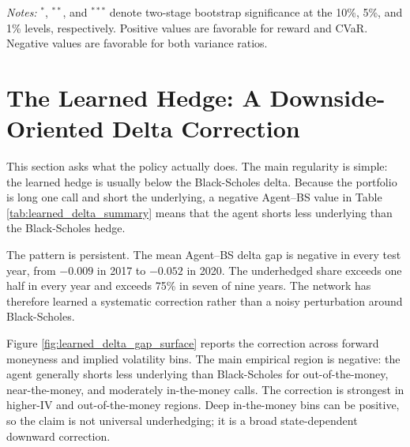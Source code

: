 \documentclass[a4paper,12pt]{article}
\numberwithin{equation}{section}
\begin{document}
\begin{table}[H]
    \centering
    \caption{Compact walk-forward performance summary. Entries are agent-minus-Black-Scholes differences for reward and CVaR, and log agent-to-Black-Scholes ratios for downside variance and ordinary variance.}
    \label{tab:wf_metric_summary}
    
    \vspace{0.15cm}

    \begin{minipage}{0.92\textwidth}
    \footnotesize
    \emph{Notes:} $^{*}$, $^{**}$, and $^{***}$ denote two-stage bootstrap significance at the 10\%, 5\%, and 1\% levels, respectively. Positive values are favorable for reward and CVaR. Negative values are favorable for both variance ratios.
    \end{minipage}
\end{table}


\section{The Learned Hedge: A Downside-Oriented Delta Correction}

This section asks what the policy actually does. The main regularity is simple: the learned hedge is usually below the Black-Scholes delta. Because the portfolio is long one call and short the underlying, a negative Agent--BS value in Table \ref{tab:learned_delta_summary} means that the agent shorts less underlying than the Black-Scholes hedge.

\begin{table}[H]
    \centering
    \caption{Average hedge ratios in the walk-forward test years. Agent Delta is the positive hedge ratio implied by the traded agent position; BS Delta is the corresponding Black-Scholes hedge ratio. Underhedged Share is the fraction of hedge intervals in which Agent Delta is below BS Delta.}
    \label{tab:learned_delta_summary}
    
\end{table}

The pattern is persistent. The mean Agent--BS delta gap is negative in every test year, from $-0.009$ in 2017 to $-0.052$ in 2020. The underhedged share exceeds one half in every year and exceeds 75\% in seven of nine years. The network has therefore learned a systematic correction rather than a noisy perturbation around Black-Scholes.

Figure \ref{fig:learned_delta_gap_surface} reports the correction across forward moneyness and implied volatility bins. The main empirical region is negative: the agent generally shorts less underlying than Black-Scholes for out-of-the-money, near-the-money, and moderately in-the-money calls. The correction is strongest in higher-IV and out-of-the-money regions. Deep in-the-money bins can be positive, so the claim is not universal underhedging; it is a broad state-dependent downward correction.
\end{document}
